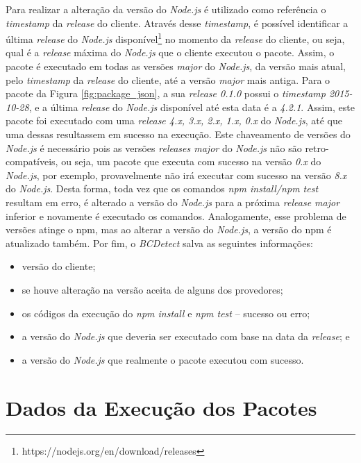 Para realizar a alteração da versão do \textit{Node.js} é utilizado como referência o \textit{timestamp} da \textit{release} do cliente. Através desse \textit{timestamp}, é possível identificar a última \textit{release} do \textit{Node.js} disponível\footnote{https://nodejs.org/en/download/releases} no momento da \textit{release} do cliente, ou seja, qual é a \textit{release} máxima do \textit{Node.js} que o cliente executou o pacote. Assim, o pacote é executado em todas as versões \textit{major} do \textit{Node.js}, da versão mais atual, pelo \textit{timestamp} da \textit{release} do cliente, até a versão \textit{major} mais antiga. Para o pacote da Figura \ref{fig:package_json}, a sua \textit{release 0.1.0} possui o \textit{timestamp 2015-10-28}, e a última \textit{release} do \textit{Node.js} disponível até esta data é a \textit{4.2.1}. Assim, este pacote foi executado com uma \textit{release 4.x, 3.x, 2.x, 1.x, 0.x} do \textit{Node.js}, até que uma dessas resultassem em sucesso na execução. Este chaveamento de versões do \textit{Node.js} é necessário pois as versões \textit{releases major} do \textit{Node.js} não são retro-compatíveis, ou seja, um pacote que executa com sucesso na versão \textit{0.x} do \textit{Node.js}, por exemplo, provavelmente não irá executar com sucesso na versão \textit{8.x} do \textit{Node.js}. Desta forma, toda vez que os comandos \textit{npm install/npm test} resultam em erro, é alterado a versão do \textit{Node.js} para a próxima \textit{release major} inferior e novamente é executado os comandos. Analogamente, esse problema de versões atinge o \gls{npm}, mas ao alterar a versão do \textit{Node.js}, a versão do \gls{npm} é atualizado também. Por fim, o \textit{BCDetect} salva as seguintes informações:

\begin{itemize}
    \item versão do cliente;
    \item se houve alteração na versão aceita de alguns dos provedores;
    \item os códigos da execução do \textit{npm install} e \textit{npm test} -- sucesso ou erro;
    \item a versão do \textit{Node.js} que deveria ser executado com base na data da \textit{release}; e
    \item a versão do \textit{Node.js} que realmente o pacote executou com sucesso.
\end{itemize}{}

\section{Dados da Execução dos Pacotes}
\label{sec:col_dados}

